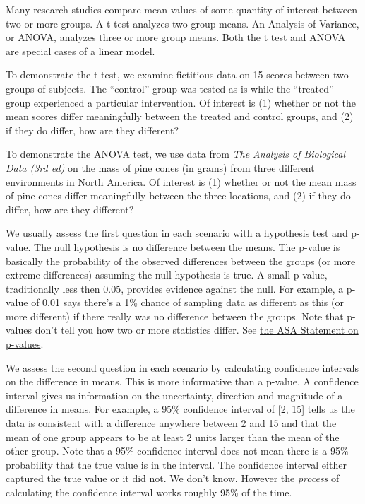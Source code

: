 \documentclass[
]{book}
\begin{document}
Many research studies compare mean values of some quantity of interest between two or more groups. A t test analyzes two group means. An Analysis of Variance, or ANOVA, analyzes three or more group means. Both the t test and ANOVA are special cases of a linear model.

To demonstrate the t test, we examine fictitious data on 15 scores between two groups of subjects. The ``control'' group was tested as-is while the ``treated'' group experienced a particular intervention. Of interest is (1) whether or not the mean scores differ meaningfully between the treated and control groups, and (2) if they do differ, how are they different?

To demonstrate the ANOVA test, we use data from \emph{The Analysis of Biological Data (3rd ed)}\citep{whitlock_schluter_2020} on the mass of pine cones (in grams) from three different environments in North America. Of interest is (1) whether or not the mean mass of pine cones differ meaningfully between the three locations, and (2) if they do differ, how are they different?

We usually assess the first question in each scenario with a hypothesis test and p-value. The null hypothesis is no difference between the means. The p-value is basically the probability of the observed differences between the groups (or more extreme differences) assuming the null hypothesis is true. A small p-value, traditionally less then 0.05, provides evidence against the null. For example, a p-value of 0.01 says there's a 1\% chance of sampling data as different as this (or more different) if there really was no difference between the groups. Note that p-values don't tell you how two or more statistics differ. See \href{https://www.tandfonline.com/doi/full/10.1080/00031305.2016.1154108\#_i28}{the ASA Statement on p-values}.

We assess the second question in each scenario by calculating confidence intervals on the difference in means. This is more informative than a p-value. A confidence interval gives us information on the uncertainty, direction and magnitude of a difference in means. For example, a 95\% confidence interval of {[}2, 15{]} tells us the data is consistent with a difference anywhere between 2 and 15 and that the mean of one group appears to be at least 2 units larger than the mean of the other group. Note that a 95\% confidence interval does not mean there is a 95\% probability that the true value is in the interval. The confidence interval either captured the true value or it did not. We don't know. However the \emph{process} of calculating the confidence interval works roughly 95\% of the time.
\end{document}
